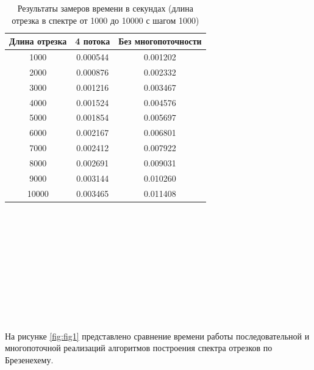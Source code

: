 \begin{table}[h]
    \begin{center}
        \caption{Результаты замеров времени в секундах (длина отрезка в спектре от 1000 до 10000 с шагом 1000)}
        \label{tbl:time_mes_difdiam}
        \begin{tabular}{|c|c|c|}
            \hline
            Длина отрезка & 4 потока & Без многопоточности \\
            \hline
            1000 & 0.000544 & 0.001202 \\ \hline  
            2000 & 0.000876 & 0.002332 \\ \hline
            3000 & 0.001216 & 0.003467 \\ \hline
            4000 & 0.001524 & 0.004576 \\ \hline 
            5000 & 0.001854 & 0.005697 \\ \hline 
            6000 & 0.002167 & 0.006801 \\ \hline 
            7000 & 0.002412 & 0.007922 \\ \hline 
            8000 & 0.002691 & 0.009031 \\ \hline 
            9000 & 0.003144 & 0.010260 \\ \hline
            10000 & 0.003465 & 0.011408 \\ \hline  
		\end{tabular}
\end{center}
\end{table}
\\
\\
\\
\\
\\
\\
\\
\\
\\
\\

\FloatBarrier
На рисунке \ref{fig:fig1} представлено сравнение времени работы последовательной и многопоточной реализаций алгоритмов построения спектра отрезков по Брезенехему.

